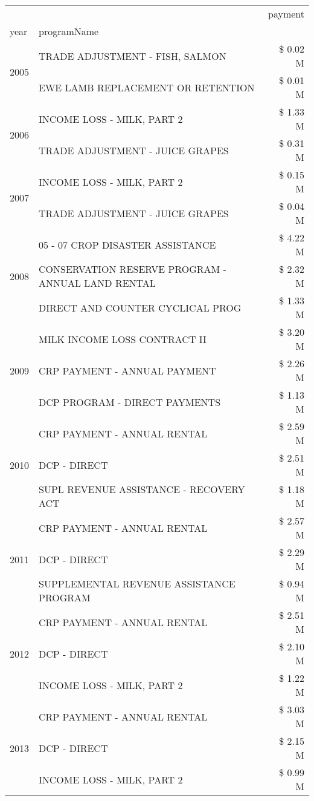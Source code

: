 \begin{tabular}{llr}
\toprule
 &  & payment \\
year & programName &  \\
\midrule
\multirow[t]{2}{*}{2005} & TRADE ADJUSTMENT - FISH, SALMON & \$ 0.02 M \\
 & EWE LAMB REPLACEMENT OR RETENTION & \$ 0.01 M \\
\cline{1-3}
\multirow[t]{2}{*}{2006} & INCOME LOSS - MILK, PART 2 & \$ 1.33 M \\
 & TRADE ADJUSTMENT - JUICE GRAPES & \$ 0.31 M \\
\cline{1-3}
\multirow[t]{2}{*}{2007} & INCOME LOSS - MILK, PART 2 & \$ 0.15 M \\
 & TRADE ADJUSTMENT - JUICE GRAPES & \$ 0.04 M \\
\cline{1-3}
\multirow[t]{3}{*}{2008} & 05 - 07 CROP DISASTER ASSISTANCE & \$ 4.22 M \\
 & CONSERVATION RESERVE PROGRAM - ANNUAL LAND RENTAL & \$ 2.32 M \\
 & DIRECT AND COUNTER CYCLICAL PROG & \$ 1.33 M \\
\cline{1-3}
\multirow[t]{3}{*}{2009} & MILK INCOME LOSS CONTRACT II & \$ 3.20 M \\
 & CRP PAYMENT - ANNUAL PAYMENT & \$ 2.26 M \\
 & DCP PROGRAM - DIRECT PAYMENTS & \$ 1.13 M \\
\cline{1-3}
\multirow[t]{3}{*}{2010} & CRP PAYMENT - ANNUAL RENTAL & \$ 2.59 M \\
 & DCP - DIRECT & \$ 2.51 M \\
 & SUPL REVENUE ASSISTANCE - RECOVERY ACT & \$ 1.18 M \\
\cline{1-3}
\multirow[t]{3}{*}{2011} & CRP PAYMENT - ANNUAL RENTAL & \$ 2.57 M \\
 & DCP - DIRECT & \$ 2.29 M \\
 & SUPPLEMENTAL REVENUE ASSISTANCE PROGRAM & \$ 0.94 M \\
\cline{1-3}
\multirow[t]{3}{*}{2012} & CRP PAYMENT - ANNUAL RENTAL & \$ 2.51 M \\
 & DCP - DIRECT & \$ 2.10 M \\
 & INCOME LOSS - MILK, PART 2 & \$ 1.22 M \\
\cline{1-3}
\multirow[t]{3}{*}{2013} & CRP PAYMENT - ANNUAL RENTAL & \$ 3.03 M \\
 & DCP - DIRECT & \$ 2.15 M \\
 & INCOME LOSS - MILK, PART 2 & \$ 0.99 M \\
\cline{1-3}

\end{tabular}
